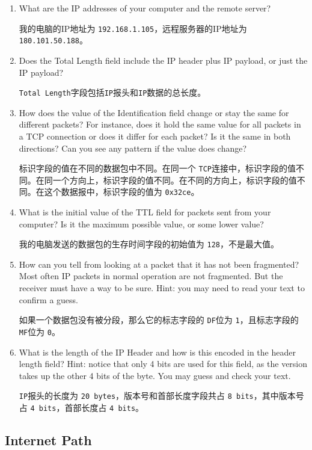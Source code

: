 \documentclass{article}
\begin{document}
	\begin{enumerate}[noitemsep]
		\item What are the IP addresses of your computer and the remote server?
		
		我的电脑的IP地址为 \texttt{192.168.1.105}，远程服务器的IP地址为 \texttt{180.101.50.188}。
		\item Does the Total Length field include the IP header plus IP payload, or just the IP payload?
		
		\texttt{Total Length}字段包括\texttt{IP}报头和\texttt{IP}数据的总长度。
		\item How does the value of the Identification field change or stay the same for different packets? For instance, does it hold the same value for all packets in a TCP connection or does it differ for each packet? Is it the same in both directions? Can you see any pattern if the value does change?
		
		标识字段的值在不同的数据包中不同。在同一个 \texttt{TCP}连接中，标识字段的值不同。在同一个方向上，标识字段的值不同。在不同的方向上，标识字段的值不同。在这个数据报中，标识字段的值为 \texttt{0x32ce}。
		\item What is the initial value of the TTL field for packets sent from your computer? Is it the maximum possible value, or some lower value?
		
		我的电脑发送的数据包的生存时间字段的初始值为 \texttt{128}，不是最大值。
		\item How can you tell from looking at a packet that it has not been fragmented? Most often IP packets in normal operation are not fragmented. But the receiver must have a way to be sure. Hint: you may need to read your text to confirm a guess.
		
		如果一个数据包没有被分段，那么它的标志字段的 \texttt{DF}位为 \texttt{1}，且标志字段的 \texttt{MF}位为 \texttt{0}。
		\item What is the length of the IP Header and how is this encoded in the header length field? Hint: notice that only 4 bits are used for this field, as the version takes up the other 4 bits of the byte. You may guess and check your text.
		
		\texttt{IP}报头的长度为 \texttt{20 bytes}，版本号和首部长度字段共占 \texttt{8 bits}，其中版本号占 \texttt{4 bits}，首部长度占 \texttt{4 bits}。
	\end{enumerate}
	
	\subsection{Internet Path}
	
\end{document}

